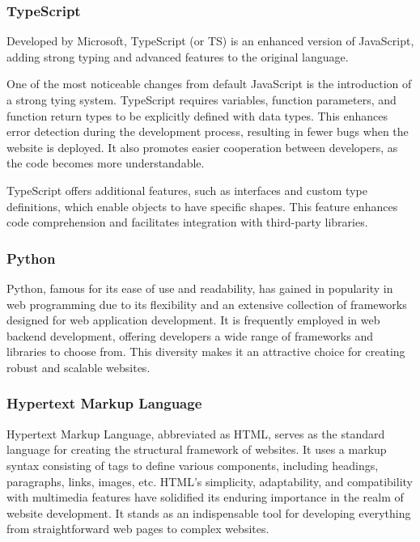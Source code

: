 \documentclass[12pt,oneside,openright,a4paper]{cpe-english-project}
\begin{document}
      \subsubsection{TypeScript}
        \qquad Developed by Microsoft, TypeScript (or TS) is an enhanced version of JavaScript, adding strong typing and advanced features to the original language.\par
        \qquad One of the most noticeable changes from default JavaScript is the introduction of a strong tying system. TypeScript requires variables, function parameters, and function return types to be explicitly defined with data types. This enhances error detection during the development process, resulting in fewer bugs when the website is deployed. It also promotes easier cooperation between developers, as the code becomes more understandable.\par
        \qquad TypeScript offers additional features, such as interfaces and custom type definitions, which enable objects to have specific shapes. This feature enhances code comprehension and facilitates integration with third-party libraries.\par
      
      \subsubsection{Python}
        \qquad Python, famous for its ease of use and readability, has gained in popularity in web programming due to its flexibility and an extensive collection of frameworks designed for web application development. It is frequently employed in web backend development, offering developers a wide range of frameworks and libraries to choose from. This diversity makes it an attractive choice for creating robust and scalable websites.\par
  
      \subsubsection{Hypertext Markup Language}
        \qquad Hypertext Markup Language, abbreviated as HTML, serves as the standard language for creating the structural framework of websites. It uses a markup syntax consisting of tags to define various components, including headings, paragraphs, links, images, etc. HTML’s simplicity, adaptability, and compatibility with multimedia features have solidified its enduring importance in the realm of website development. It stands as an indispensable tool for developing everything from straightforward web pages to complex websites.\par
  
\end{document}
